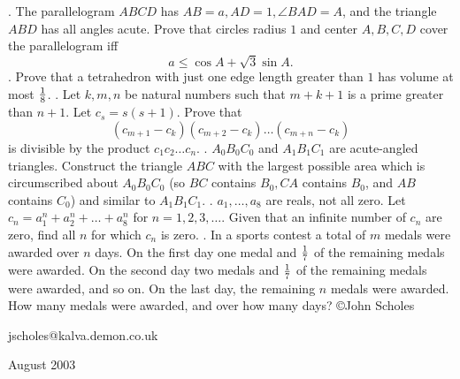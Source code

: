 \nopagenumbers
{}
\vskip 25pt
. The parallelogram $ABCD$ has $AB=a,AD=1,\angle BAD=A$, and the triangle $ABD$ has all angles acute. Prove that circles radius $1$ and center $A,B,C,D$ cover the parallelogram iff $$a\le\cos A+\sqrt3\sin A.$$
\vskip 12pt
. Prove that a tetrahedron with just one edge length greater than $1$ has volume at most $1\over8$.
\vskip 12pt
. Let $k,m,n$ be natural numbers such that $m+k+1$ is a prime greater than $n+1$. Let $c_s=s(s+1)$. Prove that $$(c_{m+1}-c_k)(c_{m+2}-c_k)\ldots(c_{m+n}-c_k)$$ is divisible by the product $c_1c_2\ldots c_n$.
\vskip 12pt
. $A_0B_0C_0$ and $A_1B_1C_1$ are acute-angled triangles. Construct the triangle $ABC$ with the largest possible area which is circumscribed about $A_0B_0C_0$ (so $BC$ contains $B_0, CA$ contains $B_0$, and $AB$ contains $C_0$) and similar to $A_1B_1C_1$.
\vskip 12pt
. $a_1,\ldots,a_8$ are reals, not all zero. Let $c_n=a_1^n+a_2^n+\ldots+a_8^n$ for $n=1,2,3,\ldots$. Given that an infinite number of $c_n$ are zero, find all $n$ for which $c_n$ is zero.
\vskip 12pt
. In a sports contest a total of $m$ medals were awarded over $n$ days. On the first day one medal and $1\over7$ of the remaining medals were awarded. On the second day two medals and $1\over7$ of the remaining medals were awarded, and so on. On the last day, the remaining $n$ medals were awarded. How many medals were awarded, and over how many days?
\vskip 20pt
\noindent \copyright John Scholes

\noindent jscholes@kalva.demon.co.uk

 August 2003

\bye
